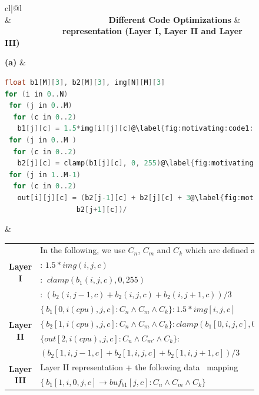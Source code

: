 \begin{figure}[t!]
    \centering
    \scriptsize
\begin{tabular}{cl|@{}l}
\\\hline
  &
    \ \ \ \ \ \ \ \ \ \ \ \ \ \ \ \ \ \ \ \ \ \ \ 
    \textbf{Different Code Optimizations}
  &
    \ \ \ \ \ \ \ \ \ \ \ \ \ \  
    \textbf{\framework representation (Layer I, Layer II and Layer III)}
\\\hline

{\textbf{\normalsize(a)}} &
\begin{lstlisting}[language=C,escapechar=@]
float b1[M][3], b2[M][3], img[N][M][3]
for (i in 0..N)
 for (j in 0..M)
  for (c in 0..2)
   b1[j][c] = 1.5*img[i][j][c]@\label{fig:motivating:code1:stmt1}@
 for (j in 0..M )
  for (c in 0..2)
   b2[j][c] = clamp(b1[j][c], 0, 255)@\label{fig:motivating:code1:stmt2}@
 for (j in 1..M-1)
  for (c in 0..2)
   out[i][j][c] = (b2[j-1][c] + b2[j][c] + 3@\label{fig:motivating:code1:stmt3}@
                 b2[j+1][c])/
\end{lstlisting}
    &  
\begin{tabular}{c|l}
\multirow{4}{*}{\textbf{Layer I}}
    & In the following, we use $C_n$, $C_m$ and $C_k$ which are defined above.\\
    & {\boldsymbol{$\{b_1\ (i, j, c): C_n \wedge C_m \wedge C_k\} $}}: $1.5*img(i, j, c)$\\
    & {\boldsymbol{$\{b_2\ (i, j, c): C_n \wedge C_m  \wedge C_k\}$}}: $\ clamp(b_1(i, j, c), 0, 255)$ \\
    & {\boldsymbol{$\{out(i, j, c): C_n \wedge C_m \wedge C_k\}$}}: $(b_2(i,j-1,c)+b_2(i,j,c)+b_2(i,j+1,c))/3$ \\\hline
\multirow{4}{*}{\textbf{Layer II}}
    & $\{\ b_1[0, i (cpu), j, c]: C_n \wedge C_m \wedge C_k\}: 1.5*img[i, j, c]$\\
    & $\{\ b_2[1, i (cpu), j, c]: C_n \wedge C_m \wedge C_k\}: clamp(b_1[0, i, j, c], 0, 255)$\\
    &$\{out[2, i (cpu), j, c]: C_n\wedge C_{m'} \wedge C_k \}:$\\
    &$(b_2[1,i,j-1,c]+b_2[1,i,j,c]+b_2[1,i,j+1,c])/3$\\\hline
\multirow{4}{*}{\textbf{Layer III}}
    & Layer II representation + the following data \ mapping\\
    & $\{\ b_1[1, i, 0, j, c] \rightarrow buf_{b1}[j,c]:  C_n \wedge C_m \wedge C_k\} $ \color{listinggreen}{ /* $C_n$, $C_m$ and $C_k$ are defined above. */} \\

\end{tabular}
\end{tabular}
\end{figure}
